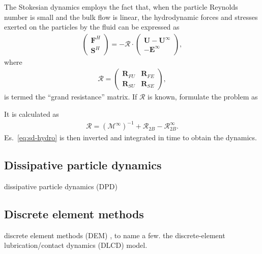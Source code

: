 The Stokesian dynamics \citep{Brady_Bossis1988} employs the fact that, when the particle Reynolds number is small and the bulk flow is linear, the hydrodynamic forces and stresses exerted on the particles by the fluid can be expressed as
\begin{equation} 
 \begin{aligned} \label{eq:sd-hydro}
  \begin{pmatrix}
   {\bm F}^H \\
   {\bm S}^H
  \end{pmatrix}
  = - \mathscr{R} \cdot
  \begin{pmatrix}
   {\bm U}-{\bm U}^\infty \\
   -{\bm E}^\infty
  \end{pmatrix},
 \end{aligned}
\end{equation}
where
\begin{equation} 
 \begin{aligned}
  \mathscr{R} =
  \begin{pmatrix}
   {\bm R}_{FU} & {\bm R}_{FE} \\
   {\bm R}_{SU} & {\bm R}_{SE}
  \end{pmatrix},
 \end{aligned}
\end{equation}
is termed the ``grand resistance'' matrix. 
If $\mathscr{R}$ is known, 
formulate the problem as

It is calculated as
\begin{equation} 
 \begin{aligned}
  \mathscr{R} = (\mathscr{M}^\infty)^{-1} +\mathscr{R}_{2B} - \mathscr{R}_{2B}^\infty.
 \end{aligned}
\end{equation}          
Es.\ \eqref{eq:sd-hydro} is then inverted and integrated in time to obtain the dynamics.


\subsection{Dissipative particle dynamics}

dissipative particle dynamics (DPD) \citep{Hoogerbrugge_1992, Groot_Warren_1997}


\subsection{Discrete element methods}


discrete element methods (DEM) \citep{Mari_Seto_2014JoR, Cheal_Ness_2018}, to name a few.
 the discrete-element lubrication/contact dynamics (DLCD) model.




